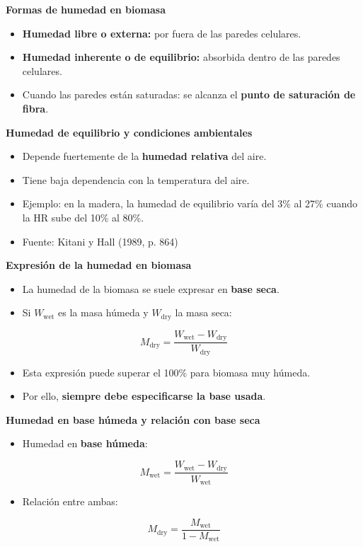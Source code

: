 \documentclass[../../main.tex]{subfiles}
\begin{document}
\begin{frame}{\textbf{Formas de humedad en biomasa}}
\begin{itemize}
    \item \textbf{Humedad libre o externa:} por fuera de las paredes celulares.
    \item \textbf{Humedad inherente o de equilibrio:} absorbida dentro de las paredes celulares.
    \item Cuando las paredes est\'an saturadas: se alcanza el \textbf{punto de saturaci\'on de fibra}.
\end{itemize}
\textbf{Humedad de equilibrio y condiciones ambientales}
\begin{itemize}
    \item Depende fuertemente de la \textbf{humedad relativa} del aire.
    \item Tiene baja dependencia con la temperatura del aire.
    \item Ejemplo: en la madera, la humedad de equilibrio var\'ia del 3\% al 27\% cuando la HR sube del 10\% al 80\%.
    \item Fuente: Kitani y Hall (1989, p. 864)
\end{itemize}
\end{frame}
\begin{frame}{\textbf{Expresi\'on de la humedad en biomasa}}
\begin{itemize}
    \item La humedad de la biomasa se suele expresar en \textbf{base seca}.
    \item Si \( W_{\text{wet}} \) es la masa h\'umeda y \( W_{\text{dry}} \) la masa seca:
\end{itemize}
\[
M_{\text{dry}} = \frac{W_{\text{wet}} - W_{\text{dry}}}{W_{\text{dry}}} 
\]
\begin{itemize}
    \item Esta expresi\'on puede superar el 100\% para biomasa muy h\'umeda.
    \item Por ello, \textbf{siempre debe especificarse la base usada}.
\end{itemize}
\end{frame}

\begin{frame}{\textbf{Humedad en base h\'umeda y relaci\'on con base seca}}
\begin{itemize}
    \item Humedad en \textbf{base h\'umeda}:
\end{itemize}
\[
M_{\text{wet}} = \frac{W_{\text{wet}} - W_{\text{dry}}}{W_{\text{wet}}} 
\]
\begin{itemize}
    \item Relaci\'on entre ambas:
\end{itemize}
\[
M_{\text{dry}} = \frac{M_{\text{wet}}}{1 - M_{\text{wet}}}
\]
\end{frame}
\end{document}
